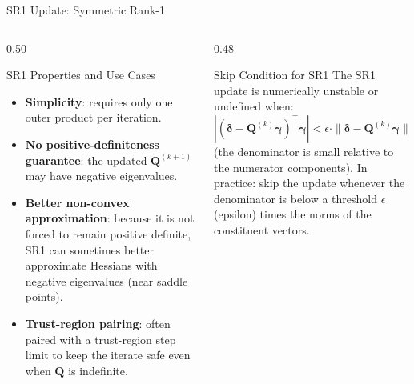 \documentclass[aspectratio=169,10pt]{beamer}
\newcommand{\deltabf}{\boldsymbol{\delta}}
\newcommand{\gammabf}{\boldsymbol{\gamma}}
\begin{document}
\begin{frame}[allowframebreaks]{SR1 Update: Symmetric Rank-1}
  \begin{columns}[T]
    \begin{column}{0.50\textwidth}
      \begin{block}{SR1 Properties and Use Cases}
        \begin{itemize}
          \item \textbf{Simplicity}: requires only one outer product per iteration.
          \item \textbf{No positive-definiteness guarantee}: the updated
            $\mathbf{Q}^{(k+1)}$ may have negative eigenvalues.
          \item \textbf{Better non-convex approximation}: because it is not forced
            to remain positive definite, SR1 can sometimes better approximate
            Hessians with negative eigenvalues (near saddle points).
          \item \textbf{Trust-region pairing}: often paired with a trust-region
            step limit to keep the iterate safe even when $\mathbf{Q}$ is
            indefinite.
        \end{itemize}
      \end{block}
    \end{column}
    \begin{column}{0.48\textwidth}
      \begin{alertblock}{Skip Condition for SR1}
        The SR1 update is numerically unstable or undefined when:
        \[
          \left|(\deltabf - \mathbf{Q}^{(k)}\gammabf)^\top\gammabf\right|
          < \epsilon \cdot \|\deltabf - \mathbf{Q}^{(k)}\gammabf\|\cdot\|\gammabf\|
        \]
        (the denominator is small relative to the numerator components).  In
        practice: skip the update whenever the denominator is below a threshold
        $\epsilon$ (epsilon) times the norms of the constituent vectors.
      \end{alertblock}
    \end{column}
  \end{columns}

  \framebreak


\end{frame}
\end{document}
